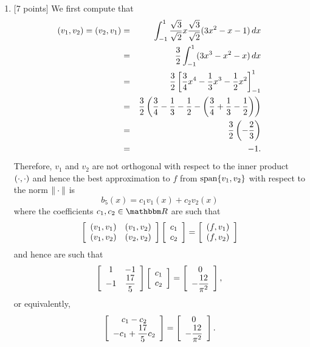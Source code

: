 \begin{solution}
\begin{enumerate}
\item {[7 points]} We first compute that
\begin{eqnarray*}
(v_1,v_2)=(v_2,v_1)&=&\int_{-1}^1{\sqrt{3} \over \sqrt{2}}x{\sqrt{3} \over \sqrt{2}}(3x^2-x-1)\,dx
\\
&=&{3 \over 2}\int_{-1}^1(3x^3-x^2-x)\,dx
\\
&=&{3 \over 2}\left[{3 \over 4}x^4-{1 \over 3}x^3-{1 \over 2}x^2\right]_{-1}^1
\\
&=&{3 \over 2}\left({3 \over 4}-{1 \over 3}-{1 \over 2}-\left({3 \over 4}+{1 \over 3}-{1 \over 2}\right)\right)
\\
&=&{3 \over 2}\left(-{2 \over 3}\right)
\\
&=&-1.
\end{eqnarray*}
Therefore, $v_1$ and $v_2$ are not orthogonal with respect to the inner product $(\cdot,\cdot)$ and hence the best approximation to $f$ from ${\rm span}\{v_1,v_2\}$ with respect to the norm $\|\cdot\|$ is
\[
b_5(x)=c_1v_1(x)+c_2v_2(x)
\]
where the coefficients $c_1,c_2\in\R$ are such that
\[
\left[\begin{array}{cc} (v_1,v_1) & (v_1,v_2) \\ (v_1,v_2) & (v_2,v_2) \end{array}\right]\left[\begin{array}{c} c_1 \\ c_2 \end{array}\right]=\left[\begin{array}{c} (f,v_1) \\ (f,v_2) \end{array}\right]
\]
and hence are such that
\[
\left[\begin{array}{cc} 1 & -1 \\ -1 & \displaystyle{{17 \over 5}} \end{array}\right]\left[\begin{array}{c} c_1 \\ c_2 \end{array}\right]=\left[\begin{array}{c} 0 \\ \displaystyle{-{12 \over \pi^2}} \end{array}\right],
\]
or equivalently,
\[
\left[\begin{array}{c} c_1-c_2 \\ \displaystyle{-c_1+{17 \over 5}c_2} \end{array}\right]=\left[\begin{array}{c} 0 \\ \displaystyle{-{12 \over \pi^2}} \end{array}\right].
\]
\end{enumerate}
\end{solution}
